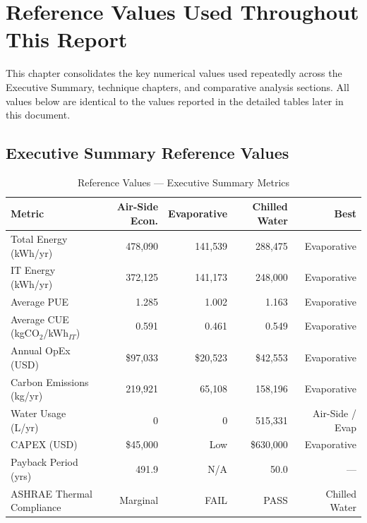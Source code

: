 \documentclass[12pt,a4paper]{report}
\begin{document}
\listoftables
\listoffigures
\newpage

\chapter{Reference Values Used Throughout This Report}
\label{ch:reference_values}

This chapter consolidates the key numerical values used repeatedly across the Executive Summary,
technique chapters, and comparative analysis sections. All values below are identical to the
values reported in the detailed tables later in this document.

\section{Executive Summary Reference Values}

\begin{table}[H]
\centering
\caption{Reference Values --- Executive Summary Metrics}
\label{tab:ref_exec}
\renewcommand{\arraystretch}{1.3}
\begin{tabular}{lrrrr}
\toprule
\textbf{Metric} & \textbf{Air-Side Econ.} & \textbf{Evaporative} & \textbf{Chilled Water} & \textbf{Best} \\
\midrule
Total Energy (kWh/yr) & 478{,}090 & 141{,}539 & 288{,}475 & Evaporative \\
IT Energy (kWh/yr) & 372{,}125 & 141{,}173 & 248{,}000 & Evaporative \\
Average PUE & 1.285 & 1.002 & 1.163 & Evaporative \\
Average CUE (kgCO$_2$/kWh$_{IT}$) & 0.591 & 0.461 & 0.549 & Evaporative \\
Annual OpEx (USD) & \$97{,}033 & \$20{,}523 & \$42{,}553 & Evaporative \\
Carbon Emissions (kg/yr) & 219{,}921 & 65{,}108 & 158{,}196 & Evaporative \\
Water Usage (L/yr) & 0 & 0 & 515{,}331 & Air-Side / Evap \\
CAPEX (USD) & \$45{,}000 & Low & \$630{,}000 & Evaporative \\
Payback Period (yrs) & 491.9 & N/A & 50.0 & --- \\
ASHRAE Thermal Compliance & Marginal & FAIL & PASS & Chilled Water \\
\bottomrule
\end{tabular}
\end{table}
\end{document}
